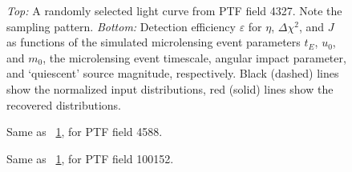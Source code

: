 \documentclass{emulateapj}
\begin{document}



\begin{figure}
\centering
	
\caption{{\it Top:} A randomly selected light curve from PTF field 4327. Note the sampling pattern. {\it Bottom:} Detection efficiency $\varepsilon$ for $\eta$, $\Delta\chi^2$, and $J$ as functions of the simulated microlensing event parameters $t_E$, $u_0$, and $m_0$, the microlensing event timescale, angular impact parameter, and `quiescent' source magnitude, respectively. Black (dashed) lines show the normalized input distributions, red (solid) lines show the recovered distributions.}  \label{fig:detection_efficiency_4327}
\end{figure}

\begin{figure}
\centering
	
\caption{Same as \figurename~\ref{fig:detection_efficiency_4327}, for PTF field 4588.}\label{fig:detection_efficiency_4588}
\end{figure}

\begin{figure}
\centering
	
\caption{Same as \figurename~\ref{fig:detection_efficiency_4327}, for PTF field 100152.}\label{fig:detection_efficiency_100152}
\end{figure}
\end{document}
